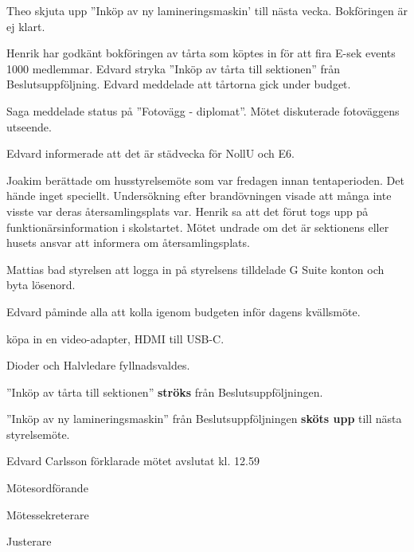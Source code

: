 \documentclass[10pt]{article}
\def\mo{Edvard Carlsson}
\def\ms{Mattias Lundström}
\def\ji{Jakob Pettersson}
\begin{document}
\begin{paragrafer}
Theo \ypa skjuta upp ''Inköp av ny lamineringsmaskin' till nästa vecka. Bokföringen är ej klart.

\Mbaby

Henrik har godkänt bokföringen av tårta som köptes in för att fira E-sek events 1000 medlemmar. 
Edvard \ypa stryka ''Inköp av tårta till sektionen'' från Beslutsuppföljning. Edvard meddelade att tårtorna gick under budget. 

\Mbaby

Saga meddelade status på ''Fotovägg - diplomat''. Mötet diskuterade fotoväggens utseende. 


Edvard informerade att det är städvecka för NollU och E6. 

Joakim berättade om husstyrelsemöte som var fredagen innan tentaperioden. Det hände inget speciellt. Undersökning efter brandövningen visade att många inte visste var deras återsamlingsplats var. 
Henrik sa att det förut togs upp på funktionärsinformation i skolstartet. Mötet undrade om det är sektionens eller husets ansvar att informera om återsamlingsplats.

Mattias bad styrelsen att logga in på styrelsens tilldelade G Suite konton och byta lösenord. 

Edvard påminde alla att kolla igenom budgeten inför dagens kvällsmöte. 



\Mba köpa in en video-adapter, HDMI till USB-C.

Dioder och Halvledare fyllnadsvaldes. 

''Inköp av tårta till sektionen'' \textbf{ströks} från Beslutsuppföljningen.

''Inköp av ny lamineringsmaskin'' från Beslutsuppföljningen \textbf{sköts upp} till nästa styrelsemöte. 

{\mo} förklarade mötet avslutat kl. 12.59
\end{paragrafer}

\hidesignfoot
\begin{signatures}{3}
\signature{\mo}{Mötesordförande}
\signature{\ms}{Mötessekreterare}
\signature{\ji}{Justerare}
\end{signatures}
\end{document}
